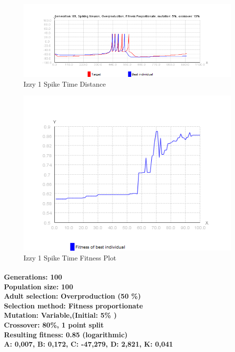 \documentclass[titlepage,norsk]{article}
\begin{document}
\begin{figure}[h!]
\centering
\includegraphics[scale=0.75]{izzy1spike.png}
\caption{Izzy 1 Spike Time Distance}
\label{fig:awesome_image}
\end{figure}

\begin{figure}[h!]
\centering
\includegraphics[scale=0.75]{izzy1spikeFitness.png}
\caption{Izzy 1 Spike Time Fitness Plot}
\label{fig:awesome_image}
\end{figure}

\paragraph{
Generations: 100\\
Population size: 100\\
Adult selection: Overproduction (50 \%) \\
Selection method: Fitness proportionate\\
Mutation: Variable,(Initial:  5\% )\\
Crossover: 80\%, 1 point split \\
Resulting fitness: 0.85 (logarithmic) \\
A: 0,007, B: 0,172, C: -47,279, D: 2,821, K: 0,041  \\
}
\end{document}
